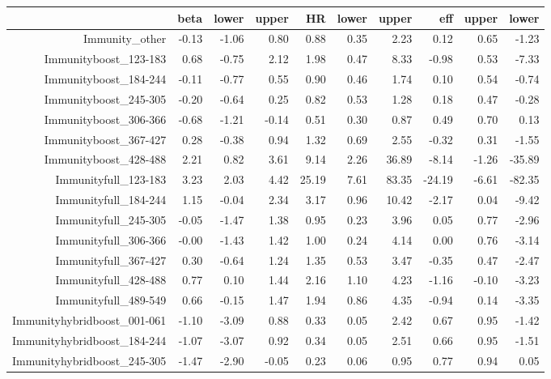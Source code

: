 \begin{table}[ht]
\centering
\begin{tabular}{rrrrrrrrrr}
  \hline
 & beta & lower & upper & HR & lower & upper & eff & upper & lower \\ 
  \hline
Immunity\_other & -0.13 & -1.06 & 0.80 & 0.88 & 0.35 & 2.23 & 0.12 & 0.65 & -1.23 \\ 
  Immunityboost\_123-183 & 0.68 & -0.75 & 2.12 & 1.98 & 0.47 & 8.33 & -0.98 & 0.53 & -7.33 \\ 
  Immunityboost\_184-244 & -0.11 & -0.77 & 0.55 & 0.90 & 0.46 & 1.74 & 0.10 & 0.54 & -0.74 \\ 
  Immunityboost\_245-305 & -0.20 & -0.64 & 0.25 & 0.82 & 0.53 & 1.28 & 0.18 & 0.47 & -0.28 \\ 
  Immunityboost\_306-366 & -0.68 & -1.21 & -0.14 & 0.51 & 0.30 & 0.87 & 0.49 & 0.70 & 0.13 \\ 
  Immunityboost\_367-427 & 0.28 & -0.38 & 0.94 & 1.32 & 0.69 & 2.55 & -0.32 & 0.31 & -1.55 \\ 
  Immunityboost\_428-488 & 2.21 & 0.82 & 3.61 & 9.14 & 2.26 & 36.89 & -8.14 & -1.26 & -35.89 \\ 
  Immunityfull\_123-183 & 3.23 & 2.03 & 4.42 & 25.19 & 7.61 & 83.35 & -24.19 & -6.61 & -82.35 \\ 
  Immunityfull\_184-244 & 1.15 & -0.04 & 2.34 & 3.17 & 0.96 & 10.42 & -2.17 & 0.04 & -9.42 \\ 
  Immunityfull\_245-305 & -0.05 & -1.47 & 1.38 & 0.95 & 0.23 & 3.96 & 0.05 & 0.77 & -2.96 \\ 
  Immunityfull\_306-366 & -0.00 & -1.43 & 1.42 & 1.00 & 0.24 & 4.14 & 0.00 & 0.76 & -3.14 \\ 
  Immunityfull\_367-427 & 0.30 & -0.64 & 1.24 & 1.35 & 0.53 & 3.47 & -0.35 & 0.47 & -2.47 \\ 
  Immunityfull\_428-488 & 0.77 & 0.10 & 1.44 & 2.16 & 1.10 & 4.23 & -1.16 & -0.10 & -3.23 \\ 
  Immunityfull\_489-549 & 0.66 & -0.15 & 1.47 & 1.94 & 0.86 & 4.35 & -0.94 & 0.14 & -3.35 \\ 
  Immunityhybridboost\_001-061 & -1.10 & -3.09 & 0.88 & 0.33 & 0.05 & 2.42 & 0.67 & 0.95 & -1.42 \\ 
  Immunityhybridboost\_184-244 & -1.07 & -3.07 & 0.92 & 0.34 & 0.05 & 2.51 & 0.66 & 0.95 & -1.51 \\ 
  Immunityhybridboost\_245-305 & -1.47 & -2.90 & -0.05 & 0.23 & 0.06 & 0.95 & 0.77 & 0.94 & 0.05 \\ 

\end{tabular}
\end{table}
